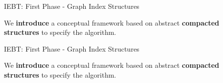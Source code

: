 \begin{frame}[fragile]{IEBT: First Phase - Graph Index Structures}
  \begin{center}
    \large We \textbf{introduce} a conceptual framework based on abstract \textbf{compacted structures} to specify the algorithm.
  \end{center}    
  \begin{table}[H]
    \centering
   \end{table}
\end{frame}

\begin{frame}[fragile]{IEBT: First Phase - Graph Index Structures}
  \begin{center}
    \large We \textbf{introduce} a conceptual framework based on abstract \textbf{compacted structures} to specify the algorithm.
  \end{center}    
  \begin{table}[H]
    \centering
   \end{table}
\end{frame}

